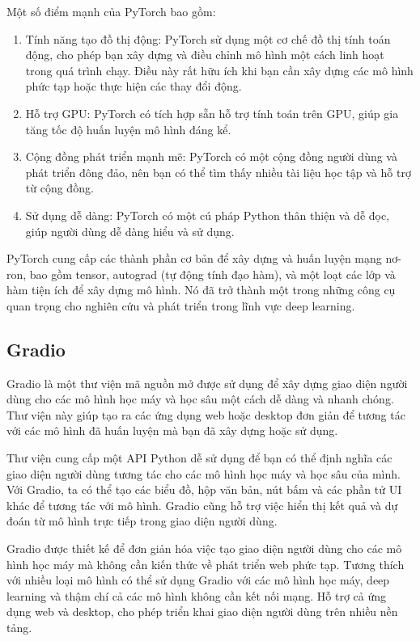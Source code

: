 Một số điểm mạnh của PyTorch bao gồm:
\begin{enumerate}
    \item Tính năng tạo đồ thị động: PyTorch sử dụng một cơ chế đồ thị tính toán động, cho phép bạn xây dựng và điều chỉnh mô hình một cách linh hoạt trong quá trình chạy. Điều này rất hữu ích khi bạn cần xây dựng các mô hình phức tạp hoặc thực hiện các thay đổi động.
    \item Hỗ trợ GPU: PyTorch có tích hợp sẵn hỗ trợ tính toán trên GPU, giúp gia tăng tốc độ huấn luyện mô hình đáng kể.
    \item Cộng đồng phát triển mạnh mẽ: PyTorch có một cộng đồng người dùng và phát triển đông đảo, nên bạn có thể tìm thấy nhiều tài liệu học tập và hỗ trợ từ cộng đồng.
    \item Sử dụng dễ dàng: PyTorch có một cú pháp Python thân thiện và dễ đọc, giúp người dùng dễ dàng hiểu và sử dụng.
\end{enumerate}
PyTorch cung cấp các thành phần cơ bản để xây dựng và huấn luyện mạng nơ-ron, bao gồm tensor, autograd (tự động tính đạo hàm), và một loạt các lớp và hàm tiện ích để xây dựng mô hình. Nó đã trở thành một trong những công cụ quan trọng cho nghiên cứu và phát triển trong lĩnh vực deep learning.

\subsection{Gradio}
Gradio là một thư viện mã nguồn mở được sử dụng để xây dựng giao diện người dùng cho các mô hình học máy và học sâu một cách dễ dàng và nhanh chóng. Thư viện này giúp tạo ra các ứng dụng web hoặc desktop đơn giản để tương tác với các mô hình đã huấn luyện mà bạn đã xây dựng hoặc sử dụng.

Thư viện cung cấp một API Python dễ sử dụng để bạn có thể định nghĩa các giao diện người dùng tương tác cho các mô hình học máy và học sâu của mình. Với Gradio, ta có thể tạo các biểu đồ, hộp văn bản, nút bấm và các phần tử UI khác để tương tác với mô hình. Gradio cũng hỗ trợ việc hiển thị kết quả và dự đoán từ mô hình trực tiếp trong giao diện người dùng.

Gradio được thiết kế để đơn giản hóa việc tạo giao diện người dùng cho các mô hình học máy mà không cần kiến thức về phát triển web phức tạp. Tương thích với nhiều loại mô hình có thể sử dụng Gradio với các mô hình học máy, deep learning và thậm chí cả các mô hình không cần kết nối mạng. Hỗ trợ cả ứng dụng web và desktop, cho phép triển khai giao diện người dùng trên nhiều nền tảng.

